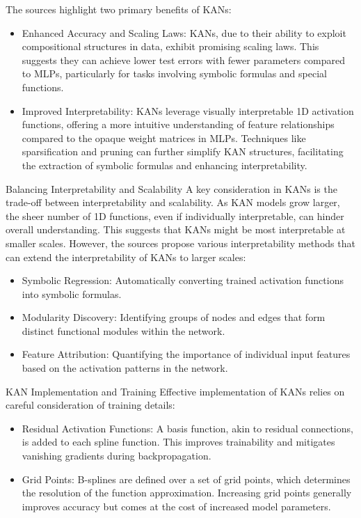 The sources highlight two primary benefits of KANs:
\begin{itemize}
    \item Enhanced Accuracy and Scaling Laws: KANs, due to their ability to exploit compositional structures in data, exhibit promising scaling laws. This suggests they can achieve lower test errors with fewer parameters compared to MLPs, particularly for tasks involving symbolic formulas and special functions.
    \item Improved Interpretability: KANs leverage visually interpretable 1D activation functions, offering a more intuitive understanding of feature relationships compared to the opaque weight matrices in MLPs. Techniques like sparsification and pruning can further simplify KAN structures, facilitating the extraction of symbolic formulas and enhancing interpretability.
\end{itemize}

Balancing Interpretability and Scalability
A key consideration in KANs is the trade-off between interpretability and scalability. As KAN models grow larger, the sheer number of 1D functions, even if individually interpretable, can hinder overall understanding. This suggests that KANs might be most interpretable at smaller scales.
However, the sources propose various interpretability methods that can extend the interpretability of KANs to larger scales:

\begin{itemize}
    \item Symbolic Regression: Automatically converting trained activation functions into symbolic formulas.
    \item Modularity Discovery: Identifying groups of nodes and edges that form distinct functional modules within the network.
    \item Feature Attribution: Quantifying the importance of individual input features based on the activation patterns in the network.
\end{itemize}

KAN Implementation and Training
Effective implementation of KANs relies on careful consideration of training details:
\begin{itemize}
    \item Residual Activation Functions: A basis function, akin to residual connections, is added to each spline function. This improves trainability and mitigates vanishing gradients during backpropagation.
    \item Grid Points: B-splines are defined over a set of grid points, which determines the resolution of the function approximation. Increasing grid points generally improves accuracy but comes at the cost of increased model parameters.
\end{itemize}

